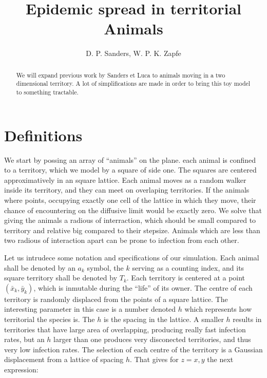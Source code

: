 \documentclass[letterpaperr,12pt]{article}
\title{Epidemic spread in territorial Animals}
\author{ D. P. Sanders, W. P. K. Zapfe}
\begin{document}
\maketitle

\begin{abstract}

We will expand previous work by Sanders et Luca to animals
moving in a two dimensional territory. A lot of simplifications
are made in order to bring this toy model to something
tractable.

\end{abstract}


\section{Definitions}

We start by possing an array of ``animals'' on the plane.
each animal is confined to a territory, which we model by
a square of side one. The squares are centered approximatively
in an square lattice. Each animal moves as a random walker
inside its territory, and they can meet on overlaping territories.
If the animals where points, occupying exactly one cell
of the lattice in which they move, their chance
of encountering on the diffusive limit would be exactly zero.
We solve that giving the animals a radious of
interraction, which should be small compared to territory
and relative big compared to their stepsize. Animals
which are less than two radious of interaction apart can
be prone to infection from each other. 

Let us intrudece some notation and specifications of our
simulation. Each animal shall be denoted by an $a_k$
 symbol, the $k$ serving as a counting index, and its
square territory shall be denoted by $T_k$. Each 
territory is centered at a point $(\bar{x}_k, \bar{y}_k)$,
which is inmutable during the ``life'' of its owner. 
The centre of each territory is randomly displaced
from the points of a square lattice. The interesting
parameter in this case is a number denoted $h$ which
represents how territorial the species is. The $h$ is the
spacing in the lattice. A smaller $h$ results
in territories that have large area of overlapping,
producing really fast infection rates, but an $h$ larger
than one produces very disconected territories,
and thus very low infection rates. The selection
of each centre of the territory is a Gaussian displacement
from a lattice of spacing $h$. That gives for
$z=x,y$ the next expression:
\end{document}
